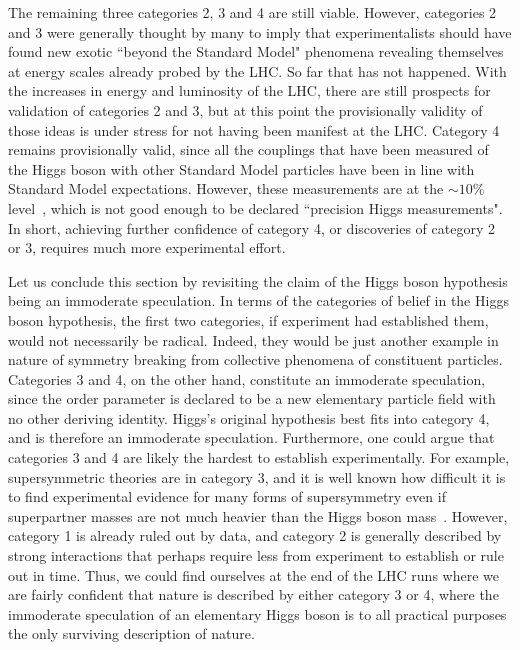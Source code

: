 \documentclass[letter,12pt]{article}
\begin{document}
The remaining three categories 2, 3 and 4 are still viable. However, categories 2 and 3 were generally thought by many to imply that experimentalists should have found new exotic ``beyond the Standard Model" phenomena revealing themselves at energy scales already probed by the LHC.  So far that has not happened. With the increases in energy and luminosity of the LHC, there are still prospects for validation of categories 2 and 3, but at this point the provisionally validity of those ideas is under stress for not having been manifest at the LHC.  Category 4 remains provisionally valid, since all the couplings that have been measured of the Higgs boson with other Standard Model particles have been in line with Standard Model expectations. However, these measurements are at the $\sim 10\%$ level~\cite{Khachatryan:2016vau}, which is not good enough to be declared ``precision Higgs measurements". In short, achieving further confidence of category 4, or discoveries of category 2 or 3, requires much more experimental effort.

Let us conclude this section by revisiting the claim of the Higgs boson hypothesis being an immoderate speculation. In terms of the categories of belief in the Higgs boson hypothesis, the first two categories, if experiment had established them, would not necessarily be radical. Indeed, they would be just another example in nature of symmetry breaking from collective phenomena of constituent particles. Categories 3 and 4, on the other hand, constitute an immoderate speculation, since the order parameter is declared to be a new elementary particle field with no other deriving identity. Higgs's original hypothesis best fits into category 4, and is therefore an immoderate speculation. Furthermore, one could argue that categories 3 and 4 are likely the hardest to establish experimentally. For example, supersymmetric theories are in category 3, and it is well known how difficult it is to find experimental evidence for many forms of supersymmetry even if superpartner masses are not much heavier than the Higgs boson mass~\cite{Fan:2011yu}. However, category 1 is already ruled out by data, and category 2 is generally described by strong interactions that perhaps require less from experiment to establish or rule out in time. Thus, we could find ourselves at the end of the LHC runs where we are fairly confident that nature is described by either category 3 or 4, where the immoderate speculation of an elementary Higgs boson is to all practical purposes the only surviving description of nature.
\end{document}
